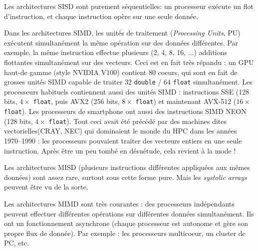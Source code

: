 Les architectures SISD sont \og purement séquentielles\fg : un processeur
exécute un flot d'instruction, et chaque instruction opère sur une seule donnée.

Dans les architectures SIMD, les unités de traitement (\og \textit{Processing
  Units}\fg, PU) exécutent simultanément la même opération sur des données
différentes. Par exemple, la même instruction effectue plusieurs (2, 4, 8, 16,
...) additions flottantes simultanément sur des \og vecteurs\fg. Ceci est en
fait très répandu : un GPU haut-de gamme (style NVIDIA V100) contient 80 \og
coeurs\fg, qui sont en fait de grosses unités SIMD capable de traiter 32
\texttt{double} / 64 \texttt{float} simultanément. Les processeurs habituels
contiennent aussi des unités SIMD : instructions SSE (128 bits, $4 \times$
\texttt{float}, puis AVX2 (256 bits, $8 \times$ \texttt{float}) et maintenant
AVX-512 ($16 \times$ \texttt{float}). Les processeurs de smartphone ont aussi
des instructions SIMD NEON (128 bits, $4 \times$ \texttt{float}). Tout ceci
avait été précédé par des machines dites \og vectorielles\fg (CRAY, NEC) qui
dominaient le monde du HPC dans les années 1970--1990 : les processeurs
pouvaient traiter des vecteurs entiers en une seule instruction. Après être un
peu tombé en désuétude, cela revient à la mode !

Les architectures MISD (plusieurs instructions différentes appliquées aux mêmes
données) sont assez rare, surtout sous cette forme pure. Mais les
\textit{systolic arrays} peuvent être vu de la sorte.

Les architectures MIMD sont très courantes : des processeurs indépendants
peuvent effectuer différentes opérations sur différentes données
simultanément. Ils ont un fonctionnement asynchrone (chaque processeur est
autonome et gère son propre flux de donnée). Par exemple : les processeurs
multicoeur, un cluster de PC, etc.

